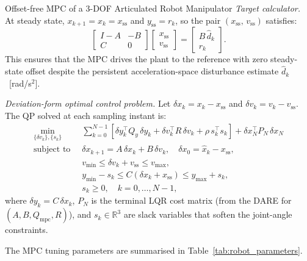 \begin{examplebox}{Offset-free MPC of a 3-DOF Articulated Robot Manipulator}
	\emph{Target calculator.}
	At steady state, $x_{k+1} = x_k = x_{\mathrm{ss}}$ and $y_{\mathrm{ss}} = r_k$,
	so the pair $(x_{\mathrm{ss}},\,v_{\mathrm{ss}})$ satisfies:
	\begin{equation*}
		\begin{bmatrix}I - A & -B \\ C & 0\end{bmatrix}
		\begin{bmatrix}x_{\mathrm{ss}} \\ v_{\mathrm{ss}}\end{bmatrix}
		=
		\begin{bmatrix}B\,\hat{d}_k \\ r_k\end{bmatrix}.
	\end{equation*}
	This ensures that the MPC drives the plant to the reference with zero steady-state
	offset despite the persistent acceleration-space disturbance estimate
	$\hat{d}_k$~[rad/s$^{2}$].
	
	\emph{Deviation-form optimal control problem.}
	Let $\delta x_k = x_k - x_{\mathrm{ss}}$ and $\delta v_k = v_k - v_{\mathrm{ss}}$.
	The QP solved at each sampling instant is:
	\begin{equation*}
		\begin{aligned}
			\min_{\{\delta v_k\},\{s_k\}}\;\;
			&\sum_{k=0}^{N-1}\!\left[
			\delta y_k^{\top} Q_y\,\delta y_k
			+ \delta v_k^{\top} R\,\delta v_k
			+ \rho\,s_k^{\top}s_k
			\right]
			+ \delta x_N^{\top} P_N\,\delta x_N \\[4pt]
			\text{subject to}\;\;
			&\delta x_{k+1} = A\,\delta x_k + B\,\delta v_k,
			\quad \delta x_0 = \hat{x}_k - x_{\mathrm{ss}},\\
			&v_{\min} \leq \delta v_k + v_{\mathrm{ss}} \leq v_{\max},\\
			&y_{\min} - s_k \leq C(\delta x_k + x_{\mathrm{ss}}) \leq y_{\max} + s_k,\\
			&s_k \geq 0, \quad k = 0, \ldots, N-1,
		\end{aligned}
	\end{equation*}
	where $\delta y_k = C\,\delta x_k$, $P_N$ is the terminal LQR cost matrix (from the
	DARE for $(A,B,Q_{\mathrm{mpc}},R)$), and $s_k \in \mathbb{R}^{3}$ are slack
	variables that soften the joint-angle constraints.
	
	The MPC tuning parameters are summarised in Table~\ref{tab:robot_parameters}.
	

\end{examplebox}
